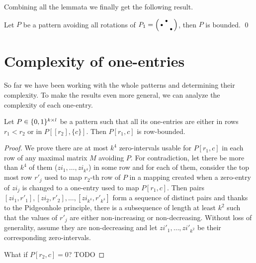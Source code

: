Combining all the lemmata we finally get the following result.

\begin{thm}
Let $P$ be a pattern avoiding all rotations of $P_1=\left(\begin{smallmatrix} &\bullet& \\\bullet& & \\ & &\bullet\end{smallmatrix}\right)$, then $P$ is bounded. \qed
\end{thm}

\section{Complexity of one-entries}
So far we have been working with the whole patterns and determining their complexity. To make the results even more general, we can analyze the complexity of each one-entry.

\begin{lemma}
\label{lemma:cross}
Let $P\in\{0,1\}^{k\times l}$ be a pattern such that all its one-entries are either in rows $r_1<r_2$ or in $P[[r_2],\{c\}]$. Then $P[r_1,c]$ is row-bounded.
\end{lemma}
\begin{proof}
We prove there are at most $k^4$ zero-intervals usable for $P[r_1,c]$ in each row of any maximal matrix $M$ avoiding $P$. For contradiction, let there be more than $k^4$ of them ($zi_1,\dots,zi_{k^4}$) in some row and for each of them, consider the top most row $r'_j$ used to map $r_2$-th row of $P$ in a mapping created when a zero-entry of $zi_j$ is changed to a one-entry used to map $P[r_1,c]$. Then pairs $[zi_1,r'_1],[zi_2,r'_2],\dots,[zi_{k^4},r'_{k^4}]$ form a sequence of distinct pairs and thanks to the Pidgeonhole principle, there is a subsequence of length at least $k^2$ such that the values of $r'_j$ are either non-increasing or non-decreasing. Without loss of generality, assume they are non-decreasing and let $zi'_1,\dots,zi'_{k^2}$ be their corresponding zero-intervals.

What if $P[r_2,c]=0$? TODO
\end{proof}


